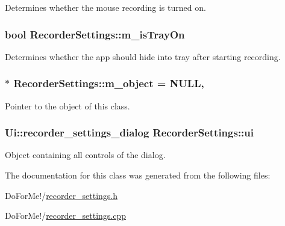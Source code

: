 Determines whether the mouse recording is turned on. 

\hypertarget{class_recorder_settings_a2b5b6ad1d9a307f00556591392dbeae8}{
\subsubsection[{m\-\_\-is\-Tray\-On}]{\setlength{\rightskip}{0pt plus 5cm}bool Recorder\-Settings\-::m\-\_\-is\-Tray\-On\hspace{0.3cm}{\ttfamily [private]}}}\label{class_recorder_settings_a2b5b6ad1d9a307f00556591392dbeae8}


Determines whether the app should hide into tray after starting recording. 

\hypertarget{class_recorder_settings_a5724a34a18697325a9c756182c4b5404}{
\subsubsection[{m\-\_\-object}]{ $\ast$ Recorder\-Settings\-::m\-\_\-object = N\-U\-L\-L\hspace{0.3cm}{\ttfamily [static]}, {\ttfamily [private]}}}\label{class_recorder_settings_a5724a34a18697325a9c756182c4b5404}


Pointer to the object of this class. 

\hypertarget{class_recorder_settings_a340469e3caa419c0ec0ad6de8905fabf}{
\subsubsection[{ui}]{\setlength{\rightskip}{0pt plus 5cm}Ui\-::recorder\-\_\-settings\-\_\-dialog Recorder\-Settings\-::ui\hspace{0.3cm}{\ttfamily [private]}}}\label{class_recorder_settings_a340469e3caa419c0ec0ad6de8905fabf}


Object containing all controls of the dialog. 



The documentation for this class was generated from the following files\-:\begin{DoxyCompactItemize}
\item 
Do\-For\-Me!/\hyperlink{recorder__settings_8h}{recorder\-\_\-settings.\-h}\item 
Do\-For\-Me!/\hyperlink{recorder__settings_8cpp}{recorder\-\_\-settings.\-cpp}\end{DoxyCompactItemize}
